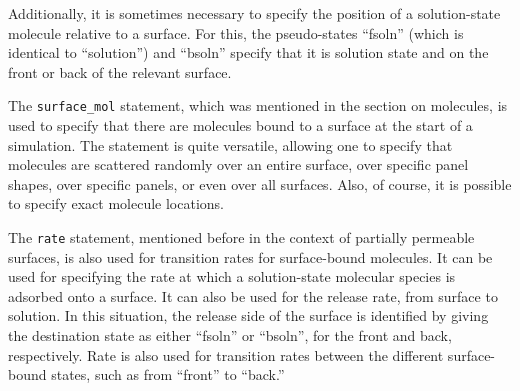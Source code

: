 \documentclass {scrbook}
\newcommand {\ttt} {\texttt}
\begin{document}
Additionally, it is sometimes necessary to specify the position of a solution-state molecule relative to a surface. For this, the pseudo-states ``fsoln'' (which is identical to ``solution'') and ``bsoln'' specify that it is solution state and on the front or back of the relevant surface.

The \ttt{surface\_mol} statement, which was mentioned in the section on molecules, is used to specify that there are molecules bound to a surface at the start of a simulation. The statement is quite versatile, allowing one to specify that molecules are scattered randomly over an entire surface, over specific panel shapes, over specific panels, or even over all surfaces. Also, of course, it is possible to specify exact molecule locations.

The \ttt{rate} statement, mentioned before in the context of partially permeable surfaces, is also used for transition rates for surface-bound molecules. It can be used for specifying the rate at which a solution-state molecular species is adsorbed onto a surface. It can also be used for the release rate, from surface to solution. In this situation, the release side of the surface is identified by giving the destination state as either ``fsoln'' or ``bsoln'', for the front and back, respectively. Rate is also used for transition rates between the different surface-bound states, such as from ``front'' to ``back.''
\end{document}
